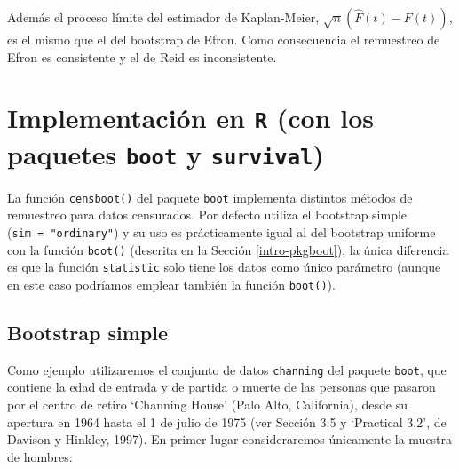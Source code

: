 \documentclass[
]{book}
\theoremstyle{break}
\theoremstyle{definition}
\theoremstyle{definition}
\theoremstyle{definition}
\theoremstyle{definition}
\theoremstyle{remark}
\begin{document}
Además el proceso límite del estimador de Kaplan-Meier, \(\sqrt{n} \left( \hat{F}\left( t \right) -F\left( t \right) \right)\), es el mismo
que el del bootstrap de Efron. Como consecuencia el remuestreo de Efron
es consistente y el de Reid es inconsistente.

\hypertarget{implementaciuxf3n-en-r-con-los-paquetes-boot-y-survival}{%
\section{\texorpdfstring{Implementación en \texttt{R} (con los paquetes \texttt{boot} y \texttt{survival})}{Implementación en R (con los paquetes boot y survival)}}\label{implementaciuxf3n-en-r-con-los-paquetes-boot-y-survival}}

La función \texttt{censboot()} del paquete \texttt{boot} implementa distintos métodos
de remuestreo para datos censurados. Por defecto utiliza el bootstrap simple
(\texttt{sim\ =\ "ordinary"}) y su uso es prácticamente igual al del bootstrap uniforme
con la función \texttt{boot()} (descrita en la Sección \ref{intro-pkgboot}),
la única diferencia es que la función \texttt{statistic} solo tiene los datos
como único parámetro (aunque en este caso podríamos emplear también
la función \texttt{boot()}).

\hypertarget{bootstrap-simple}{%
\subsection{Bootstrap simple}\label{bootstrap-simple}}

Como ejemplo utilizaremos el conjunto de datos \texttt{channing} del paquete \texttt{boot},
que contiene la edad de entrada y de partida o muerte de las personas
que pasaron por el centro de retiro `Channing House' (Palo Alto, California),
desde su apertura en 1964 hasta el 1 de julio de 1975
(ver Sección 3.5 y `Practical 3.2', de Davison y Hinkley, 1997).
En primer lugar consideraremos únicamente la muestra de hombres:
\end{document}
